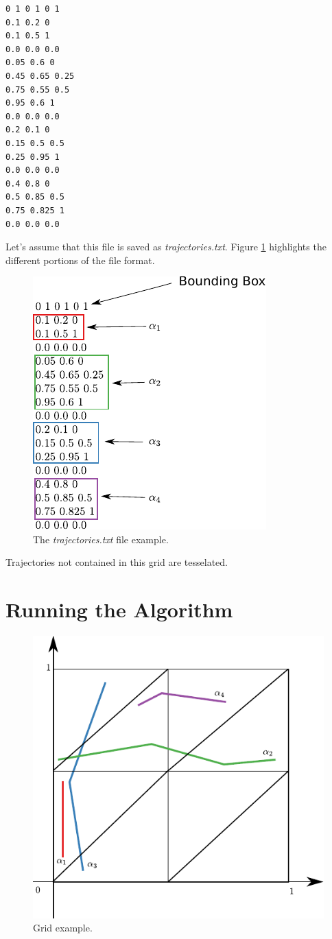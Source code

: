\documentclass[10pt]{article}
\begin{document}
\begin{lstlisting}
0 1 0 1 0 1
0.1 0.2 0
0.1 0.5 1
0.0 0.0 0.0
0.05 0.6 0
0.45 0.65 0.25
0.75 0.55 0.5
0.95 0.6 1
0.0 0.0 0.0
0.2 0.1 0
0.15 0.5 0.5
0.25 0.95 1
0.0 0.0 0.0
0.4 0.8 0
0.5 0.85 0.5
0.75 0.825 1
0.0 0.0 0.0
\end{lstlisting}

Let's assume that this file is saved as \emph{trajectories.txt}.
Figure \ref{figs:file_example} highlights the different portions of the file format.

\begin{figure}[!h]
\centerline{\includegraphics[width=0.75\linewidth]{figs/file_example.pdf}}
\caption{The \emph{trajectories.txt} file example.}
\label{figs:file_example}
\end{figure}

Trajectories not contained in this grid are tesselated. 

\section{Running the Algorithm}\label{sec:running_algorithm}

\begin{figure}[!h]
\centerline{\includegraphics[width=0.5\linewidth]{figs/grid_example.pdf}}
\caption{Grid example.}
\label{figs:grid_example}
\end{figure}
\end{document}
